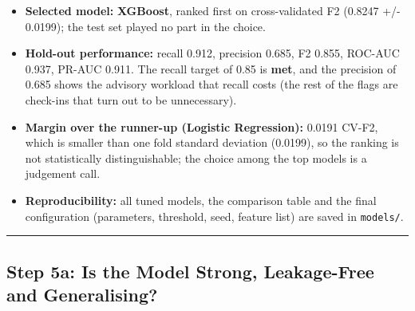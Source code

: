 \documentclass[11pt]{article}
\providecommand{\tightlist}{%
      \setlength{\itemsep}{0pt}\setlength{\parskip}{0pt}}
\begin{document}
\begin{itemize}
\tightlist
\item
  \textbf{Selected model:} \textbf{XGBoost}, ranked first on
  cross-validated F2 (0.8247 +/- 0.0199); the test set played no part in
  the choice.
\item
  \textbf{Hold-out performance:} recall 0.912, precision 0.685, F2
  0.855, ROC-AUC 0.937, PR-AUC 0.911. The recall target of 0.85 is
  \textbf{met}, and the precision of 0.685 shows the advisory workload
  that recall costs (the rest of the flags are check-ins that turn out
  to be unnecessary).
\item
  \textbf{Margin over the runner-up (Logistic Regression):} 0.0191
  CV-F2, which is smaller than one fold standard deviation (0.0199), so
  the ranking is not statistically distinguishable; the choice among the
  top models is a judgement call.
\item
  \textbf{Reproducibility:} all tuned models, the comparison table and
  the final configuration (parameters, threshold, seed, feature list)
  are saved in \texttt{models/}.
\end{itemize}

    
    \begin{center}\rule{0.5\linewidth}{0.5pt}\end{center}

\hypertarget{step-5a-is-the-model-strong-leakage-free-and-generalising}{%
\subsection{Step 5a: Is the Model Strong, Leakage-Free and
Generalising?}\label{step-5a-is-the-model-strong-leakage-free-and-generalising}}
\end{document}

